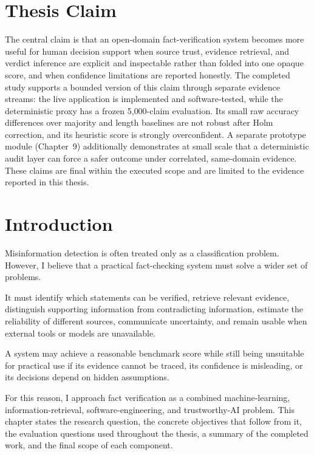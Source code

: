 \documentclass[12pt,a4paper,openany]{report}
\begin{document}
\chapter*{Thesis Claim}
The central claim is that an open-domain fact-verification system becomes more useful for human decision support when source trust, evidence retrieval, and verdict inference are explicit and inspectable rather than folded into one opaque score, and when confidence limitations are reported honestly. The completed study supports a bounded version of this claim through separate evidence streams: the live application is implemented and software-tested, while the deterministic proxy has a frozen 5{,}000-claim evaluation. Its small raw accuracy differences over majority and length baselines are not robust after Holm correction, and its heuristic score is strongly overconfident. A separate prototype module (Chapter~9) additionally demonstrates at small scale that a deterministic audit layer can force a safer outcome under correlated, same-domain evidence. These claims are final within the executed scope and are limited to the evidence reported in this thesis.

\tableofcontents
\listoftables
\listoffigures
\clearpage
{}

\chapter{Introduction}
Misinformation detection is often treated only as a classification problem. However, I believe that a practical fact-checking system must solve a wider set of problems.

It must identify which statements can be verified, retrieve relevant evidence, distinguish supporting information from contradicting information, estimate the reliability of different sources, communicate uncertainty, and remain usable when external tools or models are unavailable.

A system may achieve a reasonable benchmark score while still being unsuitable for practical use if its evidence cannot be traced, its confidence is misleading, or its decisions depend on hidden assumptions.

For this reason, I approach fact verification as a combined machine-learning, information-retrieval, software-engineering, and trustworthy-AI problem. This chapter states the research question, the concrete objectives that follow from it, the evaluation questions used throughout the thesis, a summary of the completed work, and the final scope of each component.
\end{document}
